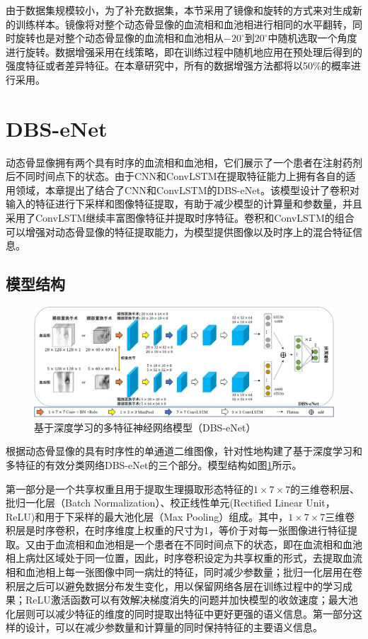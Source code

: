 由于数据集规模较小，为了补充数据集，本节采用了镜像和旋转的方式来对生成新的训练样本。镜像将对整个动态骨显像的血流相和血池相进行相同的水平翻转，同时旋转也是对整个动态骨显像的血流相和血池相从\(-20^{\circ}\)到\(20^{\circ}\)中随机选取一个角度进行旋转。数据增强采用在线策略，即在训练过程中随机地应用在预处理后得到的强度特征或者差异特征。在本章研究中，所有的数据增强方法都将以50\%的概率进行采用。

\section{DBS-eNet}

动态骨显像拥有两个具有时序的血流相和血池相，它们展示了一个患者在注射药剂后不同时间点下的状态。由于CNN和ConvLSTM在提取特征能力上拥有各自的适用领域，本章提出了结合了CNN和ConvLSTM的DBS-eNet。该模型设计了卷积对输入的特征进行下采样和图像特征提取，有助于减少模型的计算量和参数量，并且采用了ConvLSTM继续丰富图像特征并提取时序特征。卷积和ConvLSTM的组合可以增强对动态骨显像的特征提取能力，为模型提供图像以及时序上的混合特征信息。

\subsection{模型结构}

\begin{figure}[H]
  \centering
  \includegraphics[width=\textwidth]{figures/chap03_framework.jpg}
  \caption{基于深度学习的多特征神经网络模型（DBS-eNet）}
  \label{fig:chap03_framework}
\end{figure}

根据动态骨显像的具有时序性的单通道二维图像，针对性地构建了基于深度学习和多特征的有效分类网络DBS-eNet的三个部分。模型结构如图\ref{fig:chap03_framework}所示。

第一部分是一个共享权重且用于提取生理摄取形态特征的\(1 \times 7 \times 7\)的三维卷积层、批归一化层（Batch Normalization）\cite{ioffe2015batch}、校正线性单元(Rectified Linear Unit，ReLU)和用于下采样的最大池化层（Max Pooling）组成。其中，\(1 \times 7 \times 7\)三维卷积层是时序卷积，在时序维度上权重的尺寸为1，等价于对每一张图像进行特征提取。又由于血流相和血池相是一个患者在不同时间点下的状态，即在血流相和血池相上病灶区域处于同一位置，因此，时序卷积设定为共享权重的形式，去提取血流相和血池相上每一张图像中同一病灶的特征，同时减少参数量；批归一化层用在卷积层之后可以避免数据分布发生变化，用以保留网络各层在训练过程中的学习成果；ReLU激活函数可以有效解决梯度消失的问题并加快模型的收敛速度；最大池化层则可以减少特征的维度的同时提取出特征中更好更强的语义信息。第一部分这样的设计，可以在减少参数量和计算量的同时保持特征的主要语义信息。

